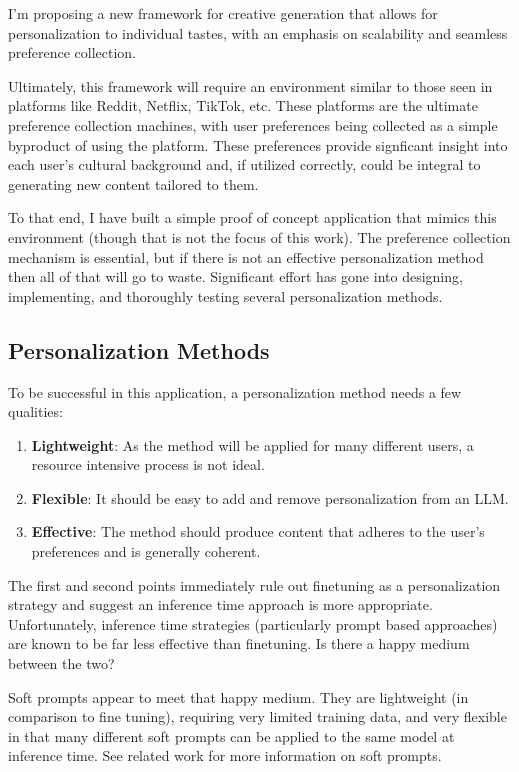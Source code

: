 \documentclass[11pt]{article}
\begin{document}
I'm proposing a new framework for creative generation that allows for personalization to individual tastes, with an emphasis on scalability and seamless preference collection.

Ultimately, this framework will require an environment similar to those seen in platforms like Reddit, Netflix, TikTok, etc. These platforms are the ultimate preference collection machines, with user preferences being collected as a simple byproduct of using the platform. These preferences provide signficant insight into each user's cultural background and, if utilized correctly, could be integral to generating new content tailored to them. 

To that end, I have built a simple proof of concept application that mimics this environment (though that is not the focus of this work). The preference collection mechanism is essential, but if there is not an effective personalization method then all of that will go to waste. Significant effort has gone into designing, implementing, and thoroughly testing several personalization methods.

\subsection{Personalization Methods}

To be successful in this application, a personalization method needs a few qualities:

\begin{enumerate}
    \item \textbf{Lightweight}: As the method will be applied for many different users, a resource intensive process is not ideal.
    \item \textbf{Flexible}: It should be easy to add and remove personalization from an LLM.
    \item \textbf{Effective}: The method should produce content that adheres to the user's preferences and is generally coherent.
\end{enumerate}

The first and second points immediately rule out finetuning as a personalization strategy and suggest an inference time approach is more appropriate. Unfortunately, inference time strategies (particularly prompt based approaches) are known to be far less effective than finetuning. Is there a happy medium between the two?

Soft prompts appear to meet that happy medium. They are lightweight (in comparison to fine tuning), requiring very limited training data, and very flexible in that many different soft prompts can be applied to the same model at inference time. See related work for more information on soft  prompts.  
\end{document}
